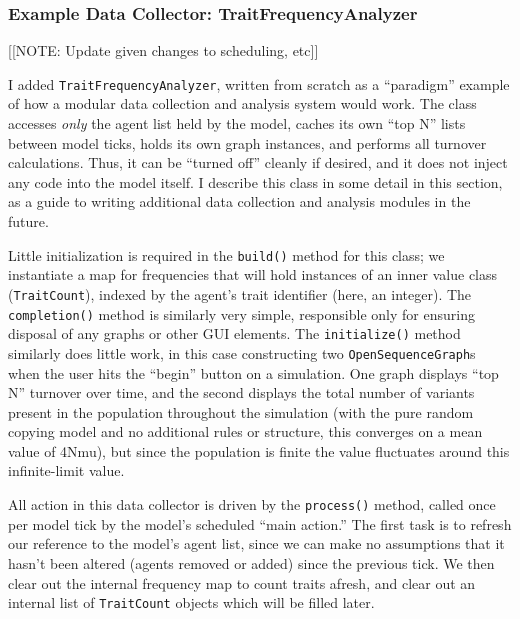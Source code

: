 \documentclass{kluwer-mem-copyright}
\begin{document}
\begin{article}
\subsubsection{Example Data Collector:  TraitFrequencyAnalyzer}
[[NOTE: Update given changes to scheduling, etc]]

I added \texttt{TraitFrequencyAnalyzer}, written from scratch as a
``paradigm'' example of how a modular data collection and analysis system would
work.  The class accesses \emph{only} the agent list held by the model, caches
its own ``top N'' lists between model ticks, holds its own graph instances, and
performs all turnover calculations.  Thus, it can be ``turned off'' cleanly if
desired, and it does not inject any code into the model itself.  I describe this
class in some detail in this section, as a guide to writing additional data
collection and analysis modules in the future.  

Little initialization is required in the \texttt{build()} method for this class;
we instantiate a map for frequencies that will hold instances of an inner value
class (\texttt{TraitCount}), indexed by the agent's trait identifier (here, an
integer).  The \texttt{completion()} method is similarly very simple,
responsible only for ensuring disposal of any graphs or other GUI elements.  The
\texttt{initialize()} method similarly does little work, in this case
constructing two \texttt{OpenSequenceGraph}s when the user hits the ``begin''
button on a simulation.  One graph displays ``top N'' turnover over time, and
the second displays the total number of variants present in the population
throughout the simulation (with the pure random copying model and no additional
rules or structure, this converges on a mean value of 4Nmu), but since the
population is finite the value fluctuates around this infinite-limit value.

All action in this data collector is driven by the \texttt{process()} method,
called once per model tick by the model's scheduled ``main action.''  The first
task is to refresh our reference to the model's agent list, since we can make no
assumptions that it hasn't been altered (agents removed or added) since the
previous tick.  We then clear out the internal frequency map to count traits
afresh, and clear out an internal list of \texttt{TraitCount} objects which will
be filled later.  


\end{article}
\end{document}

